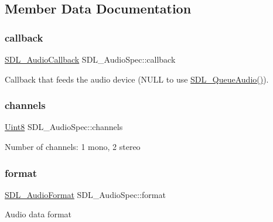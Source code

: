\subsection{Member Data Documentation}
\mbox{\label{struct_s_d_l___audio_spec_a1f8d05139f1679dcf359f49251233eac}} 
\subsubsection{\texorpdfstring{callback}{callback}}
{\footnotesize\ttfamily \hyperlink{_s_d_l__audio_8h_a379fcc25845e46bfa80cb3619fc2821c}{S\+D\+L\+\_\+\+Audio\+Callback} S\+D\+L\+\_\+\+Audio\+Spec\+::callback}

Callback that feeds the audio device (N\+U\+LL to use \hyperlink{_s_d_l__audio_8h_a19ef6fa2396f581aaf4d9a9512972268}{S\+D\+L\+\_\+\+Queue\+Audio()}). \mbox{\label{struct_s_d_l___audio_spec_a31fe8b3710cf23bbef24be8a1749fe46}} 
\subsubsection{\texorpdfstring{channels}{channels}}
{\footnotesize\ttfamily \hyperlink{_s_d_l__stdinc_8h_a2944638813a090aa23e62f4da842c3e2}{Uint8} S\+D\+L\+\_\+\+Audio\+Spec\+::channels}

Number of channels\+: 1 mono, 2 stereo \mbox{\label{struct_s_d_l___audio_spec_ae37c634cac5807762f184c8d5d49fc2d}} 
\subsubsection{\texorpdfstring{format}{format}}
{\footnotesize\ttfamily \hyperlink{_s_d_l__audio_8h_a491ed103fd25d920c4e6b7495217ce66}{S\+D\+L\+\_\+\+Audio\+Format} S\+D\+L\+\_\+\+Audio\+Spec\+::format}

Audio data format \mbox{\label{struct_s_d_l___audio_spec_a8b823ce46fc2e448cf7e6fc141aff6b2}} 

